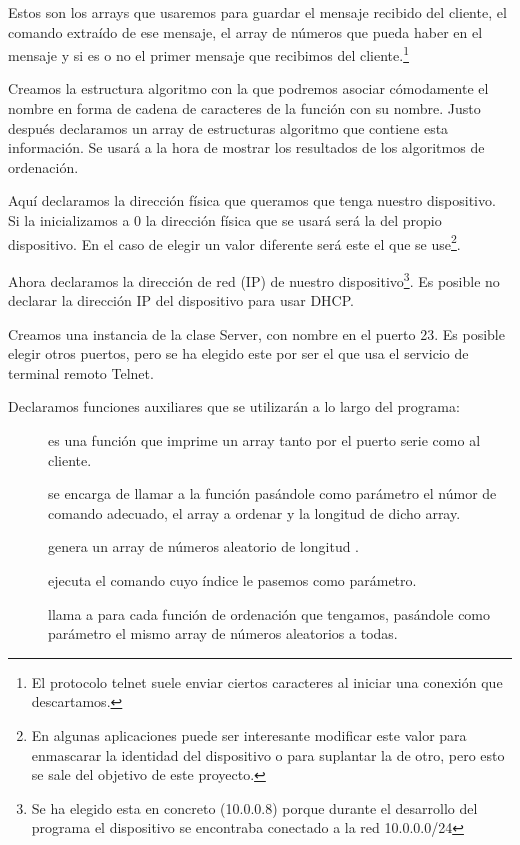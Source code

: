 
Estos son los arrays que usaremos para guardar el mensaje recibido del cliente, el comando extraído de ese mensaje, el array de números que pueda haber en el mensaje y si es o no el primer mensaje que recibimos del cliente.\protect\footnote{El protocolo telnet suele enviar ciertos caracteres al iniciar una conexión que descartamos.}


Creamos la estructura algoritmo con la que podremos asociar cómodamente el nombre en forma de cadena de caracteres de la función con su nombre. Justo después declaramos un array de estructuras algoritmo que contiene esta información. Se usará a la hora de mostrar los resultados de los algoritmos de ordenación.


Aquí declaramos la dirección física que queramos que tenga nuestro dispositivo. Si la inicializamos a 0 la dirección física que se usará será la del propio dispositivo. En el caso de elegir un valor diferente será este el que se use\protect\footnote{En algunas aplicaciones puede ser interesante modificar este valor para enmascarar la identidad del dispositivo o para suplantar la de otro, pero esto se sale del objetivo de este proyecto.}.


Ahora declaramos la dirección de red (IP) de nuestro dispositivo\protect\footnote{Se ha elegido esta en concreto (10.0.0.8) porque durante el desarrollo del programa el dispositivo se encontraba conectado a la red 10.0.0.0/24}. Es posible no declarar la dirección IP del dispositivo para usar DHCP.


Creamos una instancia de la clase Server, con nombre  en el puerto 23. Es posible elegir otros puertos, pero se ha elegido este por ser el que usa el servicio de terminal remoto Telnet.


Declaramos funciones auxiliares que se utilizarán a lo largo del programa:
\begin{description}
	\item[] es una función que imprime un array tanto por el puerto serie como al cliente.
	\item[] se encarga de llamar a la función  pasándole como parámetro el númor de comando adecuado, el array a ordenar y la longitud de dicho array.
	\item[] genera un array de números aleatorio de longitud .
	\item[] ejecuta el comando cuyo índice le pasemos como parámetro.
	\item[] llama a  para cada función de ordenación que tengamos, pasándole como parámetro el mismo array de números aleatorios a todas.
\end{description}

